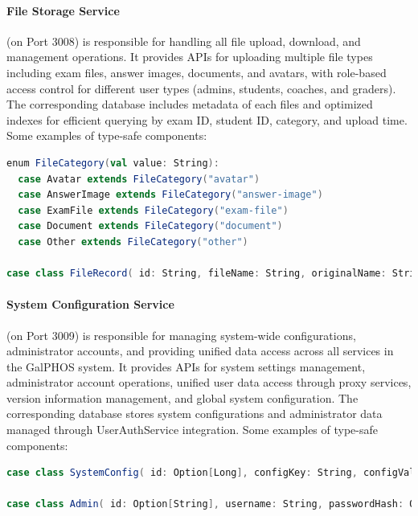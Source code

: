 \documentclass[12pt]{article}
\begin{document}
\paragraph{File Storage Service} (on Port 3008) is responsible for handling all file upload, download, and management operations. It provides APIs for uploading multiple file types including exam files, answer images, documents, and avatars, with role-based access control for different user types (admins, students, coaches, and graders). The corresponding database includes metadata of each files and optimized indexes for efficient querying by exam ID, student ID, category, and upload time. Some examples of type-safe components:

\begin{lstlisting}[language=Scala]
enum FileCategory(val value: String):
  case Avatar extends FileCategory("avatar")
  case AnswerImage extends FileCategory("answer-image")
  case ExamFile extends FileCategory("exam-file")
  case Document extends FileCategory("document")
  case Other extends FileCategory("other")

case class FileRecord( id: String, fileName: String, originalName: String, fileUrl: String, fileSize: Long, mimeType: String, fileType: Option[String] = None, category: Option[String] = None, examId: Option[String] = None, questionNumber: Option[Int] = None, studentId: Option[String] = None, uploadedBy: String, uploadTime: LocalDateTime )
\end{lstlisting}

\paragraph{System Configuration Service} (on Port 3009) is responsible for managing system-wide configurations, administrator accounts, and providing unified data access across all services in the GalPHOS system. It provides APIs for system settings management, administrator account operations, unified user data access through proxy services, version information management, and global system configuration. The corresponding database stores system configurations and administrator data managed through UserAuthService integration. Some examples of type-safe components:

\begin{lstlisting}[language=Scala]
case class SystemConfig( id: Option[Long], configKey: String, configValue: String, description: Option[String], isPublic: Boolean, createdAt: Option[ZonedDateTime], updatedAt: Option[ZonedDateTime] )

case class Admin( id: Option[String], username: String, passwordHash: Option[String], role: String, isSuperAdmin: Boolean, status: Option[String], createdAt: Option[ZonedDateTime], updatedAt: Option[ZonedDateTime], lastLogin: Option[ZonedDateTime] )
\end{lstlisting}
\end{document}
